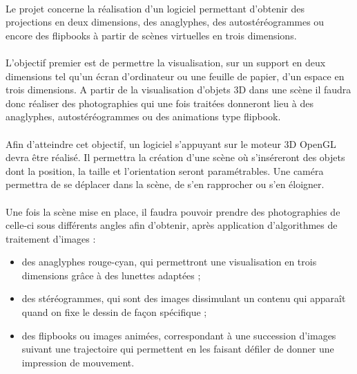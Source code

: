 \paragraph{}
	Le projet concerne la réalisation d’un logiciel permettant d’obtenir des projections en deux dimensions, des anaglyphes, des autostéréogrammes ou encore des flipbooks à partir de scènes virtuelles en trois dimensions. 

\paragraph{}
	L’objectif premier est de permettre la visualisation, sur un support en deux dimensions tel qu’un écran d’ordinateur ou une feuille de papier, d’un espace en trois dimensions. A partir de la visualisation d’objets 3D dans une scène il faudra donc réaliser des photographies qui une fois traitées donneront lieu à des anaglyphes, autostéréogrammes ou des animations type flipbook.
	
\paragraph{}
	Afin d’atteindre cet objectif, un logiciel s’appuyant sur le moteur 3D OpenGL devra être réalisé. Il permettra la création d’une scène où s’inséreront des objets dont la position, la taille et l’orientation seront paramétrables. Une caméra permettra de se déplacer dans la scène, de s’en rapprocher ou s’en éloigner.

\paragraph{}
	Une fois la scène mise en place, il faudra pouvoir prendre des photographies de celle-ci sous différents angles afin d’obtenir, après application d’algorithmes de traitement d’images :

\begin{itemize}
	\item
		des anaglyphes rouge-cyan, qui permettront une visualisation en trois dimensions grâce à des lunettes adaptées ;
	\item
		des stéréogrammes, qui sont des images dissimulant un contenu qui apparaît quand on fixe le dessin de façon spécifique ;
	\item
		des flipbooks ou images animées, correspondant à une succession d’images suivant une trajectoire qui permettent en les faisant défiler de donner une impression de mouvement.
\end{itemize}

